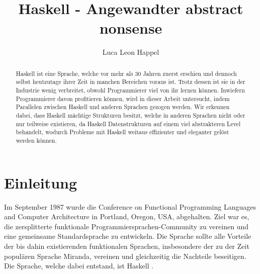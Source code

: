 \documentclass{hhuarticle}
\title{Haskell - Angewandter \glqq abstract nonsense\grqq}
\author{Luca Leon Happel} %
\theoremstyle{definition}
\theoremstyle{theorem}
\begin{document}
  \maketitle

  \begin{abstract}
    Haskell ist eine Sprache, welche vor mehr als 30 Jahren zuerst erschien
    und dennoch selbst heutzutage ihrer Zeit in manchen Bereichen voraus ist.
    Trotz dessen ist sie in der Industrie wenig verbreitet, obwohl
    Programmierer viel von ihr lernen können.
    Inwiefern Programmierer davon profitieren können,
    wird in dieser Arbeit untersucht, indem
    Parallelen zwischen Haskell und anderen Sprachen gezogen werden.
    Wir erkennen dabei, dass Haskell mächtige Strukturen besitzt, welche
    in anderen Sprachen nicht oder nur teilweise existieren, da Haskell
    Datenstrukturen auf einem viel abstrakteren Level behandelt,
    wodurch Probleme mit Haskell weitaus effizienter und eleganter
    gelöst werden können.
  \end{abstract}

\tableofcontents


  \section{Einleitung}

  Im September 1987 wurde die
  \glqq Conference on Functional Programming Languages and Computer Architecture\grqq 
  in Portland, Oregon, USA, abgehalten. Ziel war es, die zersplitterte
  funktionale Programmiersprachen-Community zu vereinen und eine
  gemeinsame Standardsprache zu entwickeln.
  Die Sprache sollte alle Vorteile der bis dahin existierenden
  funktionalen Sprachen, insbesondere der zu der Zeit populären Sprache
  \glqq Miranda\grqq , vereinen und gleichzeitig die Nachteile beseitigen.
  Die Sprache, welche dabei entstand, ist Haskell \cite{haskellHistory}.
\end{document}
